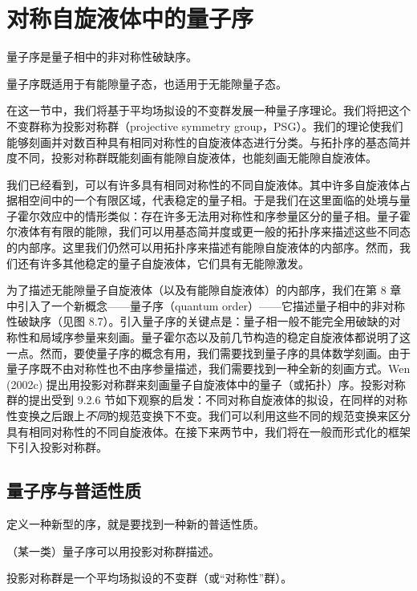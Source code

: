 \section{对称自旋液体中的量子序}

\begin{keypoints}
\item 量子序是量子相中的非对称性破缺序。
\item 量子序既适用于有能隙量子态，也适用于无能隙量子态。
\end{keypoints}

在这一节中，我们将基于平均场拟设的不变群发展一种量子序理论。我们将把这个不变群称为投影对称群（projective symmetry group，PSG）。我们的理论使我们能够刻画并对数百种具有相同对称性的自旋液体态进行分类。与拓扑序的基态简并度不同，投影对称群既能刻画有能隙自旋液体，也能刻画无能隙自旋液体。

我们已经看到，可以有许多具有相同对称性的不同自旋液体。其中许多自旋液体占据相空间中的一个有限区域，代表稳定的量子相。于是我们在这里面临的处境与量子霍尔效应中的情形类似：存在许多无法用对称性和序参量区分的量子相。量子霍尔液体有有限的能隙，我们可以用基态简并度或更一般的拓扑序来描述这些不同态的内部序。这里我们仍然可以用拓扑序来描述有能隙自旋液体的内部序。然而，我们还有许多其他稳定的量子自旋液体，它们具有无能隙激发。

为了描述无能隙量子自旋液体（以及有能隙自旋液体）的内部序，我们在第 8 章中引入了一个新概念——量子序（quantum order）——它描述量子相中的非对称性破缺序（见图 8.7）。引入量子序的关键点是：量子相一般不能完全用破缺的对称性和局域序参量来刻画。量子霍尔态以及前几节构造的稳定自旋液体都说明了这一点。然而，要使量子序的概念有用，我们需要找到量子序的具体数学刻画。由于量子序既不由对称性也不由序参量描述，我们需要找到一种全新的刻画方式。Wen (2002c) 提出用投影对称群来刻画量子自旋液体中的量子（或拓扑）序。投影对称群的提出受到 9.2.6 节如下观察的启发：不同对称自旋液体的拟设，在同样的对称性变换之后跟上\emph{不同}的规范变换下不变。我们可以利用这些不同的规范变换来区分具有相同对称性的不同自旋液体。在接下来两节中，我们将在一般而形式化的框架下引入投影对称群。

\subsection{量子序与普适性质}

\begin{keypoints}
\item 定义一种新型的序，就是要找到一种新的普适性质。
\item （某一类）量子序可以用投影对称群描述。
\item 投影对称群是一个平均场拟设的不变群（或“对称性”群）。
\end{keypoints}

